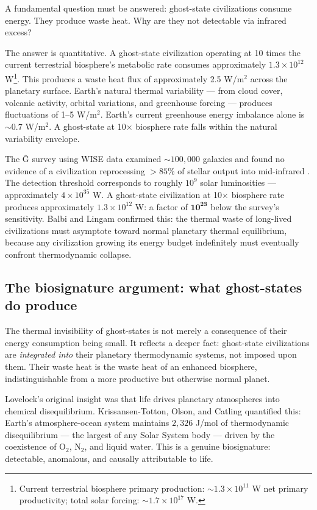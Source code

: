 \documentclass[12pt, a4paper]{article}
\begin{document}
A fundamental question must be answered: ghost-state civilizations consume energy. They
produce waste heat. Why are they not detectable via infrared excess?

The answer is quantitative. A ghost-state civilization operating at 10 times the current
terrestrial biosphere's metabolic rate consumes approximately $1.3 \times 10^{12}$
W\footnote{Current terrestrial biosphere primary production: $\sim 1.3 \times 10^{11}$ W
net primary productivity; total solar forcing: $\sim 1.7 \times 10^{17}$ W.}. This produces
a waste heat flux of approximately 2.5 W/m$^2$ across the planetary surface. Earth's natural
thermal variability --- from cloud cover, volcanic activity, orbital variations, and
greenhouse forcing --- produces fluctuations of 1--5 W/m$^2$. Earth's current greenhouse
energy imbalance alone is $\sim 0.7$ W/m$^2$. A ghost-state at 10$\times$ biosphere rate
falls within the natural variability envelope.

The Ĝ survey using WISE data examined $\sim 100{,}000$ galaxies and found no evidence of a
civilization reprocessing $>85$\% of stellar output into mid-infrared \citep{griffith2015}.
The detection threshold corresponds to roughly $10^9$ solar luminosities --- approximately
$4 \times 10^{35}$ W. A ghost-state civilization at 10$\times$ biosphere rate produces
approximately $1.3 \times 10^{12}$ W: a factor of $\mathbf{10^{23}}$ below the survey's
sensitivity. Balbi and Lingam \citep{balbi2025} confirmed this: the thermal waste of
long-lived civilizations must asymptote toward normal planetary thermal equilibrium, because
any civilization growing its energy budget indefinitely must eventually confront
thermodynamic collapse.

\subsection{The biosignature argument: what ghost-states do produce}

The thermal invisibility of ghost-states is not merely a consequence of their energy
consumption being small. It reflects a deeper fact: ghost-state civilizations are
\textit{integrated into} their planetary thermodynamic systems, not imposed upon them.
Their waste heat is the waste heat of an enhanced biosphere, indistinguishable from a
more productive but otherwise normal planet.

Lovelock's original insight \citep{lovelock1965} was that life drives planetary atmospheres
into chemical disequilibrium. Krissansen-Totton, Olson, and Catling \citep{krissansontotton2016}
quantified this: Earth's atmosphere-ocean system maintains $2{,}326$ J/mol of thermodynamic
disequilibrium --- the largest of any Solar System body --- driven by the coexistence of O$_2$,
N$_2$, and liquid water. This is a genuine biosignature: detectable, anomalous, and
causally attributable to life.
\end{document}
